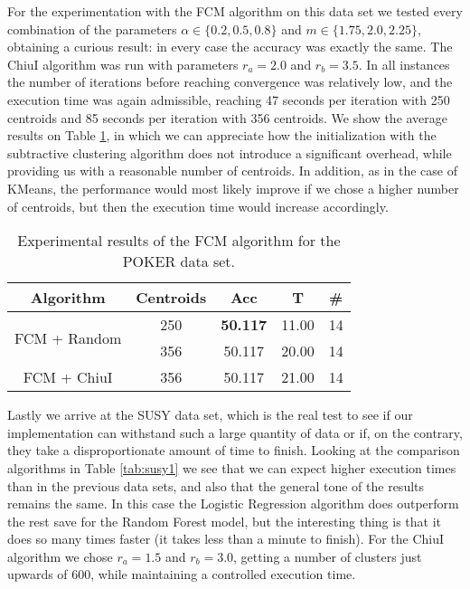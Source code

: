 For the experimentation with the FCM algorithm on this data set we tested every combination of the parameters $\alpha \in \{0.2,0.5,0.8\}$ and $m \in \{1.75,2.0,2.25\}$, obtaining a curious result: in every case the accuracy was exactly the same. The ChiuI algorithm was run with parameters $r_a=2.0$ and $r_b=3.5$. In all instances the number of iterations before reaching convergence was relatively low, and the execution time was again admissible, reaching 47 seconds per iteration with 250 centroids and 85 seconds per iteration with 356 centroids. We show the average results on Table \ref{tab:poker2}, in which we can appreciate how the initialization with the subtractive clustering algorithm does not introduce a significant overhead, while providing us with a reasonable number of centroids. In addition, as in the case of KMeans, the performance would most likely improve if we chose a higher number of centroids, but then the execution time would increase accordingly.

\begin{table}[h!]
\centering
\caption{Experimental results of the FCM algorithm for the POKER data set.}
\label{tab:poker2}
\begin{tabular}{ccccc}
\toprule
Algorithm & Centroids & Acc & T & \#\\ \midrule
\multirow{2}{*}{FCM + Random} &250 & \textbf{50.117} & 11.00 & 14\\
 & 356 & 50.117 & 20.00 & 14\\
FCM + ChiuI & 356 & 50.117 & 21.00 & 14\\ \bottomrule
\end{tabular}
\end{table}

Lastly we arrive at the SUSY data set, which is the real test to see if our implementation can withstand such a large quantity of data or if, on the contrary, they take a disproportionate amount of time to finish. Looking at the comparison algorithms in Table \ref{tab:susy1} we see that we can expect higher execution times than in the previous data sets, and also that the general tone of the results remains the same. In this case the Logistic Regression algorithm does outperform the rest save for the Random Forest model, but the interesting thing is that it does so many times faster (it takes less than a minute to finish). For the ChiuI algorithm we chose $r_a=1.5$ and $r_b=3.0$, getting a number of clusters just upwards of 600, while maintaining a controlled execution time.

